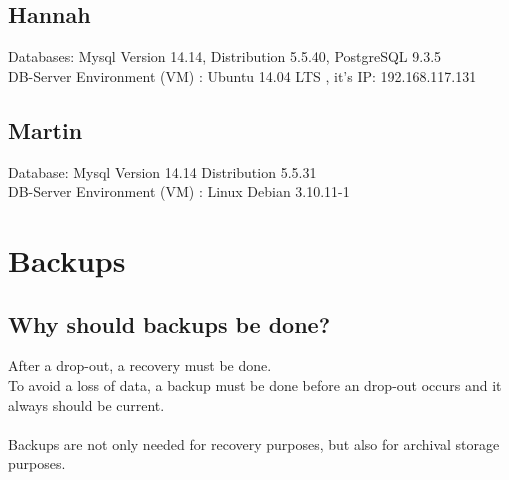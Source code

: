 \documentclass[10pt]{article}
\begin{document}
\subsection{Hannah}
Databases: Mysql Version 14.14, Distribution 5.5.40, PostgreSQL 9.3.5\\
DB-Server Environment (VM) :  Ubuntu 14.04 LTS , it's IP: 192.168.117.131
\subsection{Martin}
Database: Mysql Version 14.14 Distribution 5.5.31\\
DB-Server Environment (VM) : Linux Debian 3.10.11-1
\newpage
\newpage
\section{Backups}
\subsection{Why should backups be done?}
After a drop-out, a recovery must be done. \\
To avoid a loss of data, a backup must be done before an drop-out occurs and it always should be current. \\ \\
Backups are not only needed for recovery purposes, but also for archival storage purposes.
\end{document}
